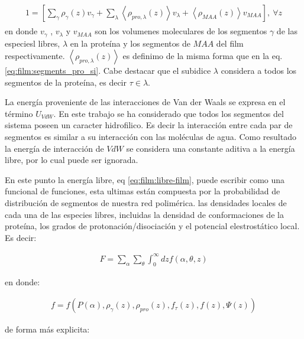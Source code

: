 \begin{align}
	\begin{aligned}
		1=  {\left[\sum_{\gamma}\rho_\gamma(z) v_\gamma + \sum_\lambda{\left<\rho_{pro,\lambda}(z)\right>v_\lambda} + \left<\rho_{MAA}(z)\right>v_{MAA} \right]},~ \forall z
	\end{aligned}
	\label{eq:film:constraint}
\end{align}
\noindent en donde $v_\gamma$ , $v_\lambda$ y $v_{MAA}$ son los volumenes moleculares de los segmentos $\gamma$ de las especiesl libres, $\lambda$  en la prote\'ina y los segmentos de $MAA$ del film respectivamente.
$\left<\rho_{pro,\lambda}(z)\right>$ es definimo de la misma forma que en la eq.  \ref{eq:film:segments_pro_si}.
Cabe destacar que el subidice $\lambda$ considera a todos los segmentos de la prote\'ina, es decir $ \tau \in \lambda$.

La energ\'ia proveniente de las interacciones de Van der Waals se expresa en el t\'ermino $U_{VdW}$. En este trabajo se ha considerado que todos los segmentos del sistema poseen un caracter hidrofilico. Es decir la interacci\'on entre cada par de segmentos es similar a su interacci\'on con las mol\'eculas de agua. Como resultado la energ\'ia de interacci\'on de $VdW$ se considera una constante aditiva a la energ\'ia libre, por lo cual puede ser ignorada.

En este punto la energ\'ia libre, eq \ref{eq:film:libre-film}, puede escribir como una funcional de funciones, esta ultimas est\'an compuesta por la probabilidad de distribuci\'on de segmentos de nuestra red polim\'erica. las densidades locales de cada una de las especies libres, incluidas la densidad de conformaciones de la prote\'ina, los grados de protonaci\'on/disociaci\'on y el potencial elestrost\'atico local. Es decir:

\begin{align}
	F = \sum_\alpha \sum_\theta \int_0^\infty dz f(\alpha, \theta,z)
\end{align}

\noindent en donde:

\begin{align}
	 f=  f \left( P(\alpha), \rho_\gamma(z),\rho_{pro}(z), f_\tau(z), f(z), \Psi(z)  \right)
	 \label{eq:film:funcionales}
 \end{align}

de forma m\'as explicita:

